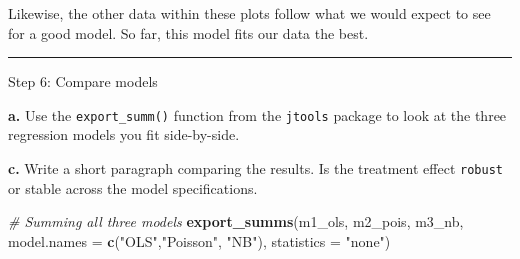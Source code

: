 \documentclass[
]{article}
\newenvironment{Shaded}{\begin{snugshade}}{\end{snugshade}}
\newcommand{\AttributeTok}[1]{\textcolor[rgb]{0.13,0.29,0.53}{#1}}
\newcommand{\CommentTok}[1]{\textcolor[rgb]{0.56,0.35,0.01}{\textit{#1}}}
\newcommand{\FunctionTok}[1]{\textcolor[rgb]{0.13,0.29,0.53}{\textbf{#1}}}
\newcommand{\NormalTok}[1]{#1}
\newcommand{\StringTok}[1]{\textcolor[rgb]{0.31,0.60,0.02}{#1}}
\begin{document}
Likewise, the other data within these plots follow what we would expect
to see for a good model. So far, this model fits our data the best.

\begin{center}\rule{0.5\linewidth}{0.5pt}\end{center}

Step 6: Compare models

\textbf{a.} Use the \texttt{export\_summ()} function from the
\texttt{jtools} package to look at the three regression models you fit
side-by-side.

\textbf{c.} Write a short paragraph comparing the results. Is the
treatment effect \texttt{robust} or stable across the model
specifications.

\begin{Shaded}
\begin{Highlighting}[]
\CommentTok{\# Summing all three models}
\FunctionTok{export\_summs}\NormalTok{(m1\_ols, m2\_pois, m3\_nb,}
             \AttributeTok{model.names =} \FunctionTok{c}\NormalTok{(}\StringTok{"OLS"}\NormalTok{,}\StringTok{"Poisson"}\NormalTok{, }\StringTok{"NB"}\NormalTok{),}
             \AttributeTok{statistics =} \StringTok{"none"}\NormalTok{)}
\end{Highlighting}
\end{Shaded}

 
  \providecommand{\huxb}[2]{\arrayrulecolor[RGB]{#1}\global\arrayrulewidth=#2pt}
  \providecommand{\huxvb}[2]{\color[RGB]{#1}\vrule width #2pt}
  \providecommand{\huxtpad}[1]{\rule{0pt}{#1}}
  \providecommand{\huxbpad}[1]{\rule[-#1]{0pt}{#1}}
\end{document}
